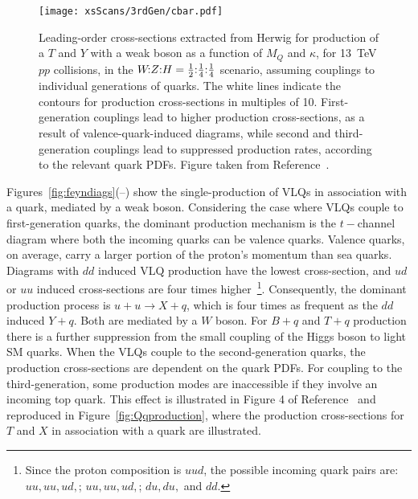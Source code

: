 \begin{figure}[t]
    \texttt{[image: xsScans/3rdGen/cbar.pdf]} %
    \caption{Leading-order cross-sections extracted from Herwig for production of a $T$ and $Y$
      with a weak boson as a function of $M_Q$ and $\kappa$, for \SI{13}{\TeV} $pp$
      collisions, in the $\text{$W\!$:$Z$:$H$} = \text{$\tfrac{1}{2}$:$\tfrac{1}{4}$:$\tfrac{1}{4}$}$ scenario, assuming couplings to individual
      generations of quarks.  The white lines indicate the contours for production
      cross-sections in multiples of 10. First-generation couplings lead to higher
      production cross-sections, as a result of valence-quark-induced diagrams,
      while second and third-generation couplings lead to suppressed production
      rates, according to the relevant quark PDFs. Figure taken from Reference~\cite{VLQ_contur}.}
    \label{fig:QVproduction}
\end{figure}
Figures~\ref{fig:feyndiags}(--) show the single-production of VLQs in association with a quark, mediated by a weak boson. Considering the case where VLQs couple to first-generation quarks, the dominant production mechanism is the $t-$channel diagram where both the incoming quarks can be valence quarks. Valence quarks, on average, carry a larger portion of the proton's momentum than sea quarks. Diagrams with $dd$ induced VLQ production have the lowest cross-section, and $ud$ or $uu$ induced cross-sections are four times higher~\footnote{Since the proton composition is $uud$, the possible incoming quark pairs are: $uu, uu, ud,$; $uu, uu, ud,$; $du, du,$ and $dd$.}. Consequently, the dominant production process is $u + u \rightarrow X + q$, which is four times as frequent as the $dd$ induced $Y + q$. Both are mediated by a $W$ boson. For $B + q$ and $T + q$ production there is a further suppression from the small coupling of the Higgs boson to light SM quarks. When the VLQs couple to the second-generation quarks, the production cross-sections are dependent on the quark PDFs. For coupling to the third-generation, some production modes are inaccessible if they involve an incoming top quark. This effect is illustrated in Figure 4 of Reference~\cite{VLQ_contur} and reproduced in Figure~\ref{fig:Qqproduction}, where the production cross-sections for $T$ and $X$ in association with a quark are illustrated.
